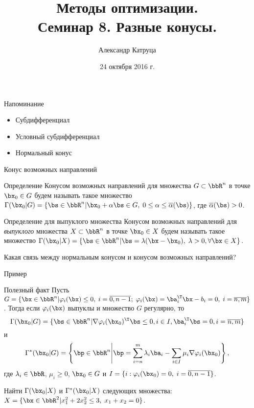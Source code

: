\documentclass[12pt]{beamer}
\title[Семинар 8]{Методы оптимизации. \\
 Семинар 8. Разные конусы.}
\author{Александр Катруца}
\institute{Московский физико-технический институт,\\
Факультет Управления и Прикладной Математики}
\date{24 октября 2016 г.}
\begin{document}
\begin{frame}
\maketitle
\end{frame}

\begin{frame}{Напоминание}
\begin{itemize}
\item Субдифференциал
\item Условный субдифференциал
\item Нормальный конус
\end{itemize}
\end{frame}

\begin{frame}{Конус возможных направлений}

\begin{block}{Определение}
Конусом возможных направлений для множества $G \subset \bbR^n$ в точке $\bx_0 \in G$ будем называть такое множество $\Gamma(\bx_0 | G) = \{ \bs \in \bbR^n | \bx_0 + \alpha\bs \in G, \; 0 \leq \alpha \leq \overline{\alpha}(\bs) \}$, где $\overline{\alpha}(\bs) > 0$.
\end{block}

\begin{block}{Определение для выпуклого множества}
Конусом возможных направлений для \emph{выпуклого} множества $X \subset \bbR^n$ в точке $\bx_0 \in X$ будем называть такое множество $\Gamma(\bx_0 | X) = \{ \bs \in \bbR^n | \bs = \lambda (\bx - \bx_0), \; \lambda > 0, \forall \bx \in X \}$.
\end{block}
Какая связь между нормальным конусом и конусом возможных направлений?

\end{frame}

\begin{frame}{Пример}
\begin{block}{Полезный факт}
Пусть $G = \{ \bx \in \bbR^n | \varphi_i(\bx) \leq 0, \; i = \overline{0,n-1}; \; \varphi_i(\bx) = \ba_i^{\T}\bx - b_i = 0, \; i = \overline{n, m} \}$. Тогда если $\varphi_i(\bx)$ выпуклы и множество $G$ регулярно, то \vspace{-4mm}
\[
\Gamma(\bx_0|G) = \{ \bs \in \bbR^n | \nabla \varphi_i(\bx_0)^{\T} \bs \leq 0, i \in I, \ba^{\T}_i \bs = 0, i = \overline{n,m} \}
\vspace{-4mm}
\]
и \vspace{-4mm}
\[
\Gamma^*(\bx_0|G) = \left \{ \bp \in \bbR^n \middle| \bp = \sum\limits_{i = n}^m \lambda_i\ba_i - \sum\limits_{i \in I} \mu_i \nabla\varphi_i(\bx_0) \right \},
\vspace{-4mm}
\]
где $\lambda_i \in \bbR$, $\mu_i \geq 0$, $\bx_0 \in G$ и $I = \{i: \varphi_i(\bx_0) = 0, \; i = \overline{0,n-1}\}$.
\end{block}
Найти $\Gamma(\bx_0|X)$ и $\Gamma^*(\bx_0|X)$ следующих множества:
$X = \{ \bx \in \bbR^2 | x^2_1 + 2x^2_2 \leq 3, \; x_1 + x_2 = 0 \}$.
\end{frame}
\end{document}
